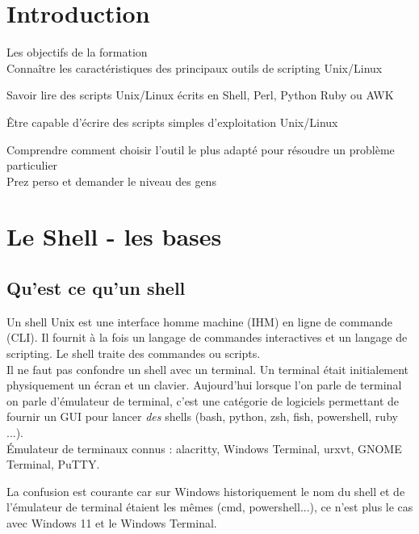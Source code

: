 \documentclass[11pt,a4paper]{article}
\begin{document}
\tableofcontents
\section{Introduction}

Les objectifs de la formation\\ 

Connaître les caractéristiques des principaux outils de scripting Unix/Linux

Savoir lire des scripts Unix/Linux écrits en Shell, Perl, Python Ruby ou AWK

Être capable d'écrire des scripts simples d'exploitation Unix/Linux

Comprendre comment choisir l'outil le plus adapté pour résoudre un problème particulier
\\

Prez perso et demander le niveau des gens

\section{Le Shell - les bases}

\subsection{Qu'est ce qu'un shell}

Un shell Unix est une interface homme machine (IHM) en ligne de commande (CLI). Il fournit à la fois un langage de commandes interactives et un langage de scripting. Le shell traite des commandes ou scripts.\\ 
Il ne faut pas confondre un shell avec un terminal. Un terminal était initialement physiquement un écran et un clavier. Aujourd'hui lorsque l'on parle de terminal on parle d'émulateur de terminal, c'est une catégorie de logiciels permettant de fournir un GUI pour lancer \textit{des} shells (bash, python, zsh, fish, powershell, ruby ...). \\ 
\'Emulateur de terminaux connus : alacritty, Windows Terminal, urxvt, GNOME Terminal, PuTTY.

La confusion est courante car sur Windows historiquement le nom du shell et de l'émulateur de terminal étaient les mêmes (cmd, powershell...), ce n'est plus le cas avec Windows 11 et le Windows Terminal.\\
\end{document}
